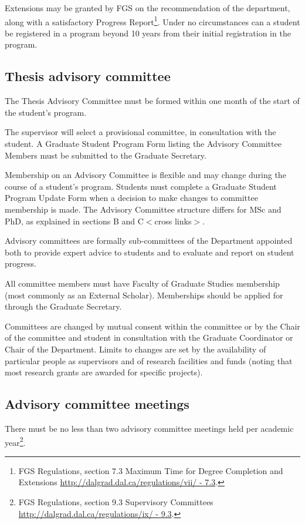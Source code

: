 \documentclass{article}
\newcommand\elink[1]{\url{#1}}
\newcommand{\fixme}[1]{\color{red}$<$#1$>$\color{black}\index{$>>>>$FIXME$<<<<$}}
\begin{document}
Extensions may be granted by FGS on the recommendation of the department, along
with a satisfactory Progress Report\footnote{FGS Regulations, section 7.3
Maximum Time for Degree Completion and Extensions
\elink{http://dalgrad.dal.ca/regulations/vii/ - 7.3}.}.  Under no circumstances
can a student be registered in a program beyond 10 years from their initial
registration in the program.


\subsection{Thesis advisory committee}

The Thesis Advisory Committee must be formed within one month of the start of
the student’s program.

The supervisor will select a provisional committee, in consultation with the
student. A Graduate Student Program Form listing the Advisory Committee Members
must be submitted to the Graduate Secretary.

Membership on an Advisory Committee is flexible and may change during the
course of a student’s program. Students must complete a Graduate Student
Program Update Form when a decision to make changes to committee membership is
made. The Advisory Committee structure differs for MSc and PhD, as explained in
sections B and C\fixme{cross links}.

Advisory committees are formally sub-committees of the Department appointed
both to provide expert advice to students and to evaluate and report on student
progress.

All committee members must have Faculty of Graduate Studies membership (most
commonly as an External Scholar). Memberships should be applied for through the
Graduate Secretary.

Committees are changed by mutual consent within the committee or by the Chair
of the committee and student in consultation with the Graduate Coordinator or
Chair of the Department. Limits to changes are set by the availability of
particular people as supervisors and of research facilities and funds (noting
that most research grants are awarded for specific projects).

\subsection{Advisory committee meetings}

There must be no less than two advisory committee meetings held per academic
year\footnote{FGS Regulations, section 9.3 Supervisory Committees
\elink{http://dalgrad.dal.ca/regulations/ix/ - 9.3}.}.
\end{document}
